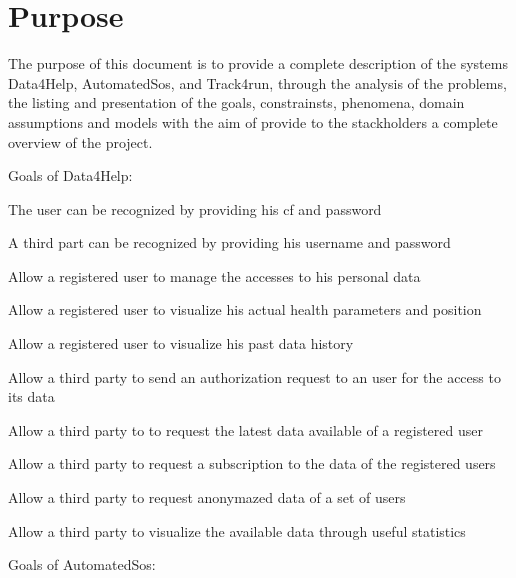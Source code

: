\section{Purpose}
The purpose of this document is to provide a complete description of the systems Data4Help, AutomatedSos, and Track4run, through the analysis of the problems, the listing and presentation of the goals, constrainsts, phenomena, domain assumptions and models with the aim of provide to the stackholders a complete overview of the project.

Goals of Data4Help:
\begin{goalList}

\begin{enumerate}[label={[}G1.\arabic*{]}]

\item\label{goal:user0}The user can be recognized by providing his cf and password
\item \label{goal:user00}A third part can be recognized by providing his username and password

    \item \label{goal:user1} Allow a registered user to manage the accesses to his personal data
    \item \label{goal:user2}Allow a registered user to visualize his actual health parameters and position
    \item \label{goal:user3}Allow a registered user to visualize his past data history
    
     \item \label{goal:parties1}Allow a third party to send an authorization request to an user for the access to its data
     \item \label{goal:parties2}Allow a third party to to request the latest data available of a registered user
 
    \item \label{goal:parties3}Allow a third party to request a subscription to the data of the registered users
    
    \item \label{goal:parties4}Allow a third party to request anonymazed data of a set of users 
    
    \item \label{goal:parties5}Allow a third party to visualize the available data through useful statistics 


\end{enumerate}
Goals of AutomatedSos:
\begin{enumerate}[label={[}G 2.\arabic*{]}]


\end{enumerate}
\end{goalList}
